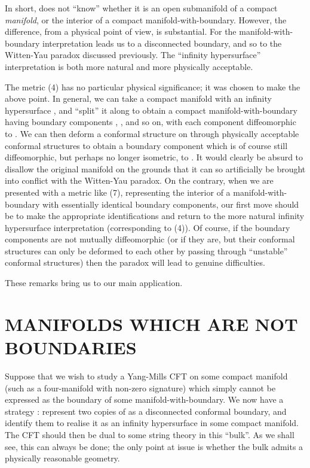 \documentclass[a4paper,12pt]{article}
\theoremstyle{definition}
\renewcommand{\u}{\textit}
\renewcommand{\-}{\myHighlight{$\dfrac{\quad\enspace}{\quad}$}\coordHE{}}
\begin{document}
In short, \coordHE{} does not ``know'' whether it is an open submanifold of a compact \u{manifold}, or the interior of a compact manifold-with-boundary. However, the difference, from a physical point of view, is substantial. For the manifold-with-boundary interpretation leads us to a disconnected boundary, and so to the Witten-Yau paradox discussed previously. The ``infinity hypersurface'' interpretation is both more natural and more physically acceptable.

The metric (4) has no particular physical significance; it was chosen to make the above point. In general, we can take a compact manifold \coordHE{} with an infinity hypersurface \coordHE{}, and ``split'' it along \coordHE{} to obtain a compact manifold-with-boundary having boundary components \coordHE{}, \coordHE{}, and so on, with each component diffeomorphic to \coordHE{}. We can then deform a conformal structure on \coordHE{} through physically acceptable conformal structures to obtain a boundary component which is of course still diffeomorphic, but perhaps no longer isometric, to \coordHE{}. It would clearly be absurd to disallow the original manifold on the grounds that it can so artificially be brought into conflict with the Witten-Yau paradox. On the contrary, when we are presented with a metric like (7), representing the interior of a manifold-with-boundary with essentially identical boundary components, our first move should be to make the appropriate identifications and return to the more natural infinity hypersurface interpretation (corresponding to (4)). Of course, if the boundary components are not mutually diffeomorphic (or if they are, but their conformal structures can only be deformed to each other by passing through ``unstable'' conformal structures) then the paradox will lead to genuine difficulties.

These remarks bring us to our main application.

\section{\large MANIFOLDS WHICH ARE NOT BOUNDARIES}

Suppose that we wish to study a Yang-Mills CFT  on some compact manifold \coordHE{} (such as a four-manifold with non-zero signature) which simply cannot be expressed as the boundary of some manifold-with-boundary. We now have a strategy : represent two copies of \coordHE{} as a disconnected conformal boundary, and identify them to realise it as an infinity hypersurface in some compact manifold. The CFT should then be dual to some string theory in this ``bulk''. As we shall see, this can always be done; the only point at issue is whether the bulk admits a physically reasonable geometry.
\end{document}

